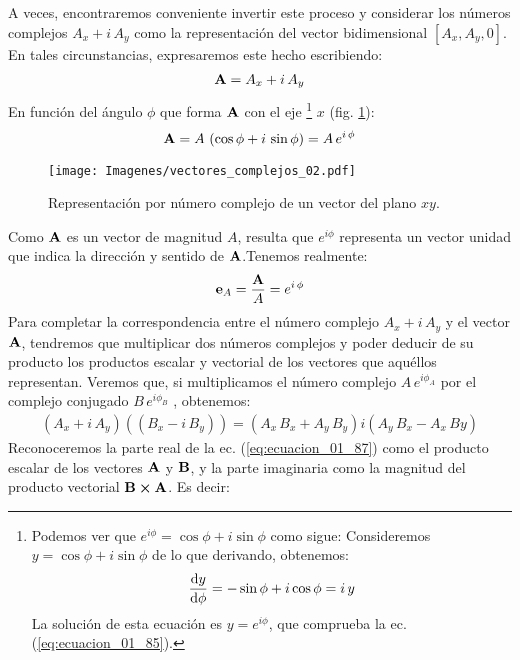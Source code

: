\documentclass[12pt]{article}
\begin{document}
\par 
A veces, encontraremos conveniente invertir este proceso y considerar los números complejos $A_{x} + i \, A_{y}$ como la representación del vector bidimensional $\left[ A_{x}, A_{y}, 0 \right]$. En tales circunstancias, expresaremos este hecho escribiendo:
\begin{align}
    \vb{A} = A_{x} + i \, A_{y}
    \label{eq:ecuacion_01_84}
\end{align}
En función del ángulo $\phi$ que forma $\vb{A}$ con el eje \footnote{Podemos ver que $e^{i \phi} = \cos \phi + i \sin \phi$ como sigue: Consideremos $y = \cos \phi +  i \sin \phi$ de lo que derivando, obtenemos:
\begin{align*}
    \dv{y}{\phi} = - \sin \phi + i \cos \phi = i \, y
\end{align*}
La solución de esta ecuación es $y = e^{i \phi}$, que comprueba la ec. (\ref{eq:ecuacion_01_85}).} $x$ (fig. \ref{fig:figura_01_24}):
\begin{align}
    \vb{A} = A \, \left( \cos \phi + i \, \sin \phi \right) = A \, e^{i \, \phi}
    \label{eq:ecuacion_01_85}
\end{align}
\begin{figure}[H]
    \centering
    \texttt{[image: Imagenes/vectores\_complejos\_02.pdf]}
    \caption{Representación por número complejo de un vector del plano $xy$.}
    \label{fig:figura_01_24}
\end{figure}
Como $\vb{A}$ es un vector de magnitud $A$, resulta que $e^{i \phi}$ representa un vector unidad que indica la dirección y sentido de $\vb{A}$.Tenemos realmente:
\begin{align}
    \vb{e}_{A} = \dfrac{\vb{A}}{A} = e^{i \, \phi}
    \label{eq:ecuacion_01_86}
\end{align}
Para completar la correspondencia entre el número complejo $A_{x} + i \, A_{y}$ y el vector $\vb{A}$, tendremos que multiplicar dos números complejos y poder deducir de su producto los productos escalar y vectorial de los vectores que aquéllos representan. Veremos que, si multiplicamos el número complejo $A \, e^{i \phi_{A}}$ por el complejo conjugado $B \, e^{i \phi_{B}}$ , obtenemos:
\begin{align}
    \left( A_{x} + i \, A_{y} \right) (\left( B_{x} - i \, B_{y} \right)) = \left( A_{x} \, B_{x} + A_{y} \, B_{y} \right) i \left( A_{y} \, B_{x} - A_{x} \, B{y} \right)
    \label{eq:ecuacion_01_87}
\end{align}
Reconoceremos la parte real de la ec. (\ref{eq:ecuacion_01_87}) como el producto escalar de los vectores $\vb{A}$ y $\vb{B}$, y la parte imaginaria como la magnitud del producto vectorial $\vb{B} \cp \vb{A}$. Es decir:
\end{document}

